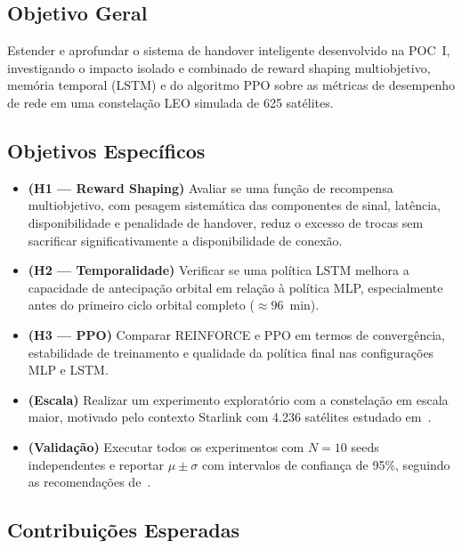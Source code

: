 \documentclass[12pt,a4paper]{article}
\begin{document}
\subsection{Objetivo Geral}

Estender e aprofundar o sistema de handover inteligente desenvolvido na POC~I,
investigando o impacto isolado e combinado de reward shaping multiobjetivo,
memória temporal (LSTM) e do algoritmo PPO sobre as métricas de desempenho de
rede em uma constelação LEO simulada de 625 satélites.

\subsection{Objetivos Específicos}

\begin{itemize}
  \item \textbf{(H1 --- Reward Shaping)} Avaliar se uma função de recompensa
        multiobjetivo, com pesagem sistemática das componentes de sinal,
        latência, disponibilidade e penalidade de handover, reduz o excesso de
        trocas sem sacrificar significativamente a disponibilidade de conexão.

  \item \textbf{(H2 --- Temporalidade)} Verificar se uma política LSTM melhora
        a capacidade de antecipação orbital em relação à política MLP,
        especialmente antes do primeiro ciclo orbital completo ($\approx
        96$~min).

  \item \textbf{(H3 --- PPO)} Comparar REINFORCE e PPO em termos de
        convergência, estabilidade de treinamento e qualidade da política final
        nas configurações MLP e LSTM.

  \item \textbf{(Escala)} Realizar um experimento exploratório com a constelação
        em escala maior, motivado pelo contexto Starlink com 4.236 satélites
        estudado em~\cite{wu2025}.

  \item \textbf{(Validação)} Executar todos os experimentos com $N=10$ seeds
        independentes e reportar $\mu \pm \sigma$ com intervalos de confiança de
        95\%, seguindo as recomendações de~\cite{henderson2018}.
\end{itemize}

\subsection{Contribuições Esperadas}
\end{document}
